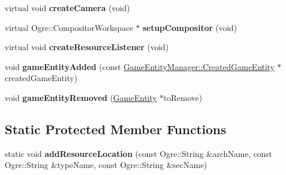 \begin{DoxyCompactItemize}
\mbox{\label{class_common_1_1_graphics_system_a84373ea7cef6f794831d98ef60227abb}} 
virtual void {\bfseries create\+Camera} (void)
\item 
\mbox{\label{class_common_1_1_graphics_system_a36c3548e669676eb5ad328d947454e81}} 
virtual Ogre\+::\+Compositor\+Workspace $\ast$ {\bfseries setup\+Compositor} (void)
\item 
\mbox{\label{class_common_1_1_graphics_system_a0c9ba8a9470920fe8dd3d19ad85698e0}} 
virtual void {\bfseries create\+Resource\+Listener} (void)
\item 
\mbox{\label{class_common_1_1_graphics_system_aaaac50f8c51dad1746ef48aaf87cad8d}} 
void {\bfseries game\+Entity\+Added} (const \hyperlink{struct_common_1_1_game_entity_manager_1_1_created_game_entity}{Game\+Entity\+Manager\+::\+Created\+Game\+Entity} $\ast$created\+Game\+Entity)
\item 
\mbox{\label{class_common_1_1_graphics_system_ad10ea4363b7d49f6a43bee937b031559}} 
void {\bfseries game\+Entity\+Removed} (\hyperlink{struct_common_1_1_game_entity}{Game\+Entity} $\ast$to\+Remove)
\end{DoxyCompactItemize}
\subsection*{Static Protected Member Functions}
\begin{DoxyCompactItemize}
\item 
\mbox{\label{class_common_1_1_graphics_system_a25c1257066ca90c4c6d9cf0dc1fa2bfb}} 
static void {\bfseries add\+Resource\+Location} (const Ogre\+::\+String \&arch\+Name, const Ogre\+::\+String \&type\+Name, const Ogre\+::\+String \&sec\+Name)
\end{DoxyCompactItemize}
